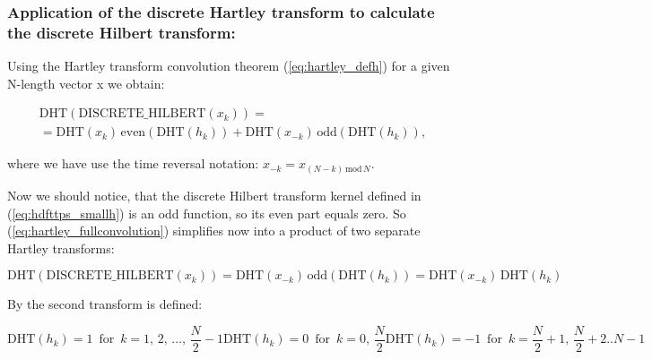 \documentclass[12pt,twoside,a4paper]{article}
\numberwithin{equation}{subsection}
\numberwithin{figure}{subsection}
\begin{document}
\subsubsection*{Application of the discrete Hartley transform to calculate the discrete Hilbert transform:}

Using the Hartley transform convolution theorem (\ref{eq:hartley_defh}) for a given N-length vector x we obtain:

\begin{multline} \label{eq:hartley_fullconvolution}
         \mathrm{DHT}(\mathrm{DISCRETE\_HILBERT}(x_k))  
  = \\ = \mathrm{DHT}(x_{k})   \, \mathrm{even}(\mathrm{DHT}(h_k)) 
       + \mathrm{DHT}(x_{- k}) \, \mathrm{odd} (\mathrm{DHT}(h_k)),
\end{multline} 

where we have use the time reversal notation: $ x_{ - k} = x_{(N - k) \, \mathrm{mod} \, N}$.

Now we should notice, that the discrete Hilbert transform kernel defined in (\ref{eq:hdfttps_smallh}) is an odd function, so its even
part equals zero. So (\ref{eq:hartley_fullconvolution}) simplifies now into a product of two separate Hartley transforms:

\begin{equation} \label{eq:hartley_simpleconvolution}
  \mathrm{DHT}(\mathrm{DISCRETE\_HILBERT}(x_k))=\mathrm{DHT}(x_{ - k})\,\mathrm{odd}(\mathrm{DHT}(h_k)) =
  \mathrm{DHT}(x_{- k})\,\mathrm{DHT}(h_k)
\end{equation}

By \cite{chang_computation} the second transform is defined:

\begin{subequations} \label{eq:hartley_strans} 
  \begin{equation}   \label{eq:hstrans_fhalf}
    \mathrm{DHT}(h_k) =  1 \, \mbox{ for } \, k = 1, \, 2, \, \ldots, \, \frac {N}{2} - 1
  \end{equation}
  \begin{equation}   \label{eq:hstrans_middle}
    \mathrm{DHT}(h_k) =  0 \, \mbox{ for } \, k = 0, \, \frac {N}{2}
  \end{equation}
  \begin{equation}   \label{eq:hstrans_shalf}
    \mathrm{DHT}(h_k) = -1 \, \mbox{ for } \, k = \frac {N}{2} + 1, \, \frac {N}{2} + 2 .. N - 1
  \end{equation}
\end{subequations}
\end{document}
